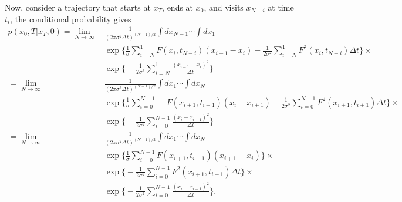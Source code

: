 \documentclass[aip,jcp,preprint,unsortedaddress,a4paper,onecolumn]{revtex4-1}
\newcommand{\dt}[0]{\Delta t}
\begin{document}
Now, consider a trajectory that starts at $x_T$, ends at $x_0$, and visits $x_{N-i}$ at time $t_i$, the conditional probability
gives
\begin{align}\nonumber
  p(x_0,T\vert x_T,0)
  =\lim_{N\rightarrow\infty} &\,
  \frac{1}{(2\pi\sigma^2\dt)^{(N-1)/2}} \int dx_{N-1}\cdots\int dx_{1}\\\nonumber
  &\,
  \exp\bigg\{\frac1\sigma\sum_{i=N}^{1} F(x_i,t_{N-i})(x_{i-1} - x_{i}) - \frac1{2\sigma^2}\sum_{i=N}^{1}F^2(x_i,t_{N-i})\dt\bigg\} \times\\\nonumber
  &\,
  \exp\bigg\{- \frac1{2\sigma^2} \sum_{i=N}^{1} \frac{(x_{i-1} - x_{i})^2}{\dt}\bigg\} \\\nonumber
  =\lim_{N\rightarrow\infty} &\,
  \frac{1}{(2\pi\sigma^2\dt)^{(N-1)/2}} \int dx_{1}\cdots\int dx_{N}\\\nonumber
  &\,
  \exp\bigg\{\frac1\sigma\sum_{i=0}^{N-1} -F(x_{i+1},t_{i+1})(x_{i} - x_{i+1}) - \frac1{2\sigma^2}\sum_{i=0}^{N-1}F^2(x_{i+1},t_{i+1})\dt\bigg\} \times\\\nonumber
  &\,
  \exp\bigg\{- \frac1{2\sigma^2} \sum_{i=0}^{N-1} \frac{(x_{i} - x_{i+1})^2}{\dt}\bigg\}\\\nonumber
  =\lim_{N\rightarrow\infty} &\,
  \frac{1}{(2\pi\sigma^2\dt)^{(N-1)/2}} \int dx_{1}\cdots\int dx_{N}\\\nonumber
  &\,
  \exp\bigg\{\frac1\sigma\sum_{i=0}^{N-1} F(x_{i+1},t_{i+1})(x_{i+1} - x_{i})\bigg\}\times\\\nonumber
  &\,
  \exp\bigg\{- \frac1{2\sigma^2}\sum_{i=0}^{N-1}F^2(x_{i+1},t_{i+1})\dt\bigg\} \times\\\nonumber
  &\,
  \exp\bigg\{- \frac1{2\sigma^2} \sum_{i=0}^{N-1} \frac{(x_{i} - x_{i+1})^2}{\dt}\bigg\}.
\end{align}

\end{document}

